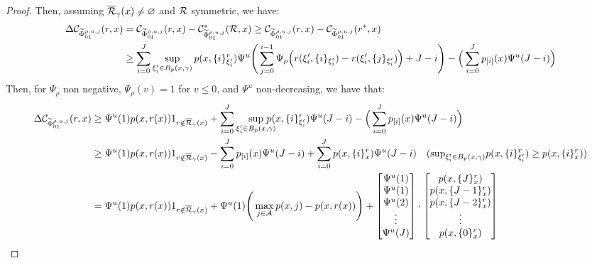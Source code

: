 \begin{appendices}
\begin{proof}
Then, assuming $\overline{\mathcal{R}}_\gamma(x)\not=\varnothing$ and $\mathcal{R}$ symmetric, we have:
\begin{equation}
    \begin{aligned}
    \Delta \mathcal{C}_{\widetilde{\Phi}_{01}^{\rho,u,j}}(r,x) & = \mathcal{C}_{\widetilde{\Phi}_{01}^{\rho,u,j}}(r,x) -  \mathcal{C}^\ast_{\widetilde{\Phi}_{01}^{\rho,u,j}}(\mathcal{R}, x) \geq \mathcal{C}_{\widetilde{\Phi}_{01}^{\rho,u,j}}(r,x) -  \mathcal{C}_{\widetilde{\Phi}_{01}^{\rho,u,j}}(r^\ast, x) \\
    & \geq \sum_{i=0}^J \sup_{\xi_i' \in B_p(x,\gamma)} p(x,\{i\}_{\xi_i'}^{r}) \Psi^u\Bigg(\sum_{j=0}^{i-1} \Psi_\rho \Big(r(\xi_i', \{i\}_{\xi_i'}) - r(\xi'_i, \{j\}_{\xi_i'})\Big) + J-i\Bigg) - \Big(\sum_{i=0}^J p_{[i]}(x)\Psi^u(J-i)\Big) \\
    \end{aligned}
\end{equation}
Then, for $\Psi_\rho$ non negative, $\Psi_\rho(v)=1$ for $v\leq0$,  and $\Psi^u$ non-decreasing, we have that:
\begin{equation}
\begin{aligned}
     \Delta \mc{C}_{\widetilde{\Phi}_{01}^{\rho,u,j}}(r,x)   &\geq \Psi^u (1)p(x, r(x)) 1_{r \notin \overline{\mc{R}}_\gamma(x)} + \sum_{i=0}^J  \sup_{\xi_i' \in B_p(x,\gamma)} \mspace{-20mu} p(x, \{i\}^r_{\xi_i'}) \Psi^u (J - i) - \Big(\sum_{i=0}^J p_{[i]}(x)\Psi^u(J-i)\Big)  \\
     & \geq \Psi^u(1)p(x, r(x)) 1_{r \notin \overline{\mc{R}}_\gamma(x)} - \sum_{i=0}^J  p_{[i]}(x)\Psi^u(J-i) + \sum_{i=0}^J p(x, \{i\}^r_x) \Psi^u (J-i) \quad (\text{sup}_{\xi_i' \in B_p(x,\gamma)} p(x, \{i\}^r_{\xi_i'}) \geq p(x, \{i\}^r_x)) \notag \\
    &= \Psi^u(1)p(x, r(x)) 1_{r \notin \overline{\mc{R}}_\gamma(x)} + \Psi^u(1) \Bigg(\max_{j \in \mathcal{A}} p(x, j) - p(x, r(x))\Bigg) + 
\begin{bmatrix}
    \Psi^u(1) \\
    \Psi^u(1) \\
    \Psi^u(2) \\
    \vdots \\
    \Psi^u(J)
\end{bmatrix}
\cdot
\begin{bmatrix}
    p(x, \{J\}^r_x) \\
    p(x, \{J-1\}^r_x) \\
    p(x, \{J-2\}^r_x) \\
    \vdots \\
    p(x, \{0\}^r_x)
\end{bmatrix}

\end{aligned}
\end{equation}
\end{proof}
\end{appendices}
